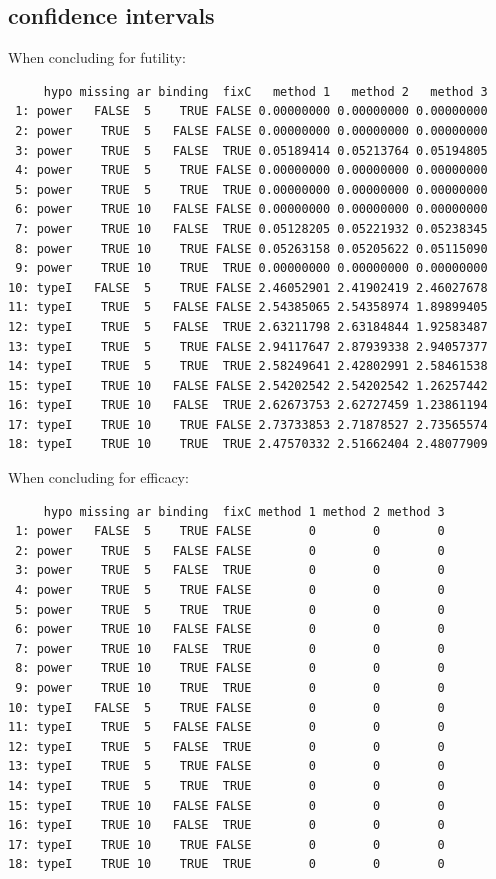 \documentclass[12pt]{article}
\begin{document}
\clearpage

\subsection{confidence intervals}
\label{sec:orgad7b21f}

When concluding for futility:
\begin{verbatim}
     hypo missing ar binding  fixC   method 1   method 2   method 3
 1: power   FALSE  5    TRUE FALSE 0.00000000 0.00000000 0.00000000
 2: power    TRUE  5   FALSE FALSE 0.00000000 0.00000000 0.00000000
 3: power    TRUE  5   FALSE  TRUE 0.05189414 0.05213764 0.05194805
 4: power    TRUE  5    TRUE FALSE 0.00000000 0.00000000 0.00000000
 5: power    TRUE  5    TRUE  TRUE 0.00000000 0.00000000 0.00000000
 6: power    TRUE 10   FALSE FALSE 0.00000000 0.00000000 0.00000000
 7: power    TRUE 10   FALSE  TRUE 0.05128205 0.05221932 0.05238345
 8: power    TRUE 10    TRUE FALSE 0.05263158 0.05205622 0.05115090
 9: power    TRUE 10    TRUE  TRUE 0.00000000 0.00000000 0.00000000
10: typeI   FALSE  5    TRUE FALSE 2.46052901 2.41902419 2.46027678
11: typeI    TRUE  5   FALSE FALSE 2.54385065 2.54358974 1.89899405
12: typeI    TRUE  5   FALSE  TRUE 2.63211798 2.63184844 1.92583487
13: typeI    TRUE  5    TRUE FALSE 2.94117647 2.87939338 2.94057377
14: typeI    TRUE  5    TRUE  TRUE 2.58249641 2.42802991 2.58461538
15: typeI    TRUE 10   FALSE FALSE 2.54202542 2.54202542 1.26257442
16: typeI    TRUE 10   FALSE  TRUE 2.62673753 2.62727459 1.23861194
17: typeI    TRUE 10    TRUE FALSE 2.73733853 2.71878527 2.73565574
18: typeI    TRUE 10    TRUE  TRUE 2.47570332 2.51662404 2.48077909
\end{verbatim}

When concluding for efficacy:
\begin{verbatim}
     hypo missing ar binding  fixC method 1 method 2 method 3
 1: power   FALSE  5    TRUE FALSE        0        0        0
 2: power    TRUE  5   FALSE FALSE        0        0        0
 3: power    TRUE  5   FALSE  TRUE        0        0        0
 4: power    TRUE  5    TRUE FALSE        0        0        0
 5: power    TRUE  5    TRUE  TRUE        0        0        0
 6: power    TRUE 10   FALSE FALSE        0        0        0
 7: power    TRUE 10   FALSE  TRUE        0        0        0
 8: power    TRUE 10    TRUE FALSE        0        0        0
 9: power    TRUE 10    TRUE  TRUE        0        0        0
10: typeI   FALSE  5    TRUE FALSE        0        0        0
11: typeI    TRUE  5   FALSE FALSE        0        0        0
12: typeI    TRUE  5   FALSE  TRUE        0        0        0
13: typeI    TRUE  5    TRUE FALSE        0        0        0
14: typeI    TRUE  5    TRUE  TRUE        0        0        0
15: typeI    TRUE 10   FALSE FALSE        0        0        0
16: typeI    TRUE 10   FALSE  TRUE        0        0        0
17: typeI    TRUE 10    TRUE FALSE        0        0        0
18: typeI    TRUE 10    TRUE  TRUE        0        0        0
\end{verbatim}
\end{document}
